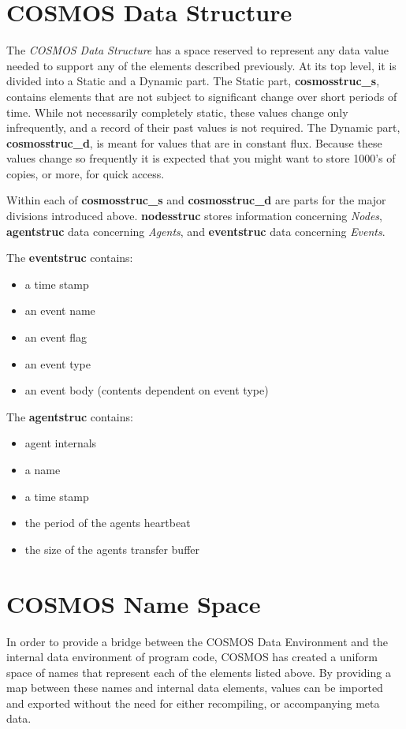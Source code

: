 \documentclass[10pt,letterpaper]{report}
\begin{document}
\chapter{COSMOS Data Structure}
The \textit{COSMOS Data Structure} has a space reserved to represent any data value needed to support any of the elements described previously. At its top level, it is divided into a Static and a Dynamic part. The Static part, \textbf{cosmosstruc\_s}, contains elements that are not subject to significant change over short periods of time. While not necessarily completely static, these values change only infrequently, and a record of their past values is not required. The Dynamic part,  \textbf{cosmosstruc\_d}, is meant for values that are in constant flux. Because these values change so frequently it is expected that you might want to store 1000's of copies, or more, for quick access.

Within each of \textbf{cosmosstruc\_s} and \textbf{cosmosstruc\_d} are parts for the major divisions introduced above. \textbf{nodesstruc} stores information concerning \textit{Nodes}, \textbf{agentstruc} data concerning \textit{Agents}, and \textbf{eventstruc} data concerning \textit{Events}.

The \textbf{eventstruc} contains:
\begin{itemize}
\item a time stamp
\item an event name 
\item an event flag
\item an event type
\item an event body (contents dependent on event type)
\end{itemize}

The \textbf{agentstruc} contains:
\begin{itemize}
\item agent internals
\item a name
\item a time stamp
\item the period of the agents heartbeat
\item the size of the agents transfer buffer
\end{itemize}

\chapter{COSMOS Name Space}
In order to provide a bridge between the COSMOS Data Environment and the internal data environment of program code, COSMOS has created a uniform space of names that represent each of the elements listed above. By providing a map between these names and internal data elements, values can be imported and exported without the need for either recompiling, or accompanying meta data.
\end{document}
